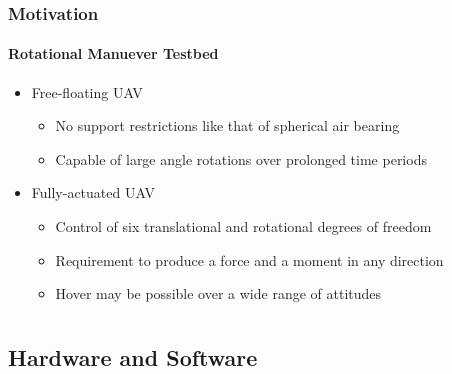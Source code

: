 \documentclass[11pt,professionalfonts,hyperref={pdftex,pdfpagemode=none,pdfstartview=FitH}]{beamer}
\begin{document}
\begin{frame}
\frametitle{Motivation}
\framesubtitle{Rotational Manuever Testbed}

\begin{itemize}
	\item Free-floating UAV
	\begin{itemize}
	\item No support restrictions like that of spherical air bearing
	\item Capable of large angle rotations over prolonged time periods
	\end{itemize}
\vspace*{0.3cm}\pause
	\item Fully-actuated UAV
	\begin{itemize}
	\item Control of six translational and rotational degrees of freedom
	\item Requirement to produce a force and a moment in any direction
	\item Hover may be possible over a wide range of attitudes
	\end{itemize}
\end{itemize}

\end{frame}


\section*{}
\subsection*{Hardware and Software}
\end{document}
